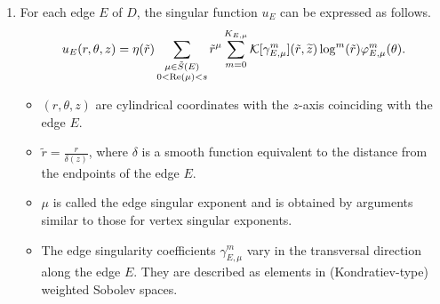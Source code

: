 ﻿\documentclass[11pt,reqno,oneside]{amsart}
\theoremstyle{definition}
\theoremstyle{remark}
\newcommand{\C}{\mathbb{C}}
\renewcommand{\S}{\mathbb{S}}
\renewcommand{\Re}{{\rm Re}}
\renewcommand{\d}{\delta}
\newcommand{\g}{\gamma}
\newcommand{\vf}{\varphi}
\newcommand{\lm}{\lambda}
\renewcommand{\t}{\theta}
\newcommand{\p}{\partial}
\renewcommand{\O}{\Omega}
\newcommand{\ds}{\displaystyle}
\begin{document}
\begin{enumerate}
\begin{itemize}
            \item The $\log$ terms appear only when $\lm$ is an integer. We will later impose a generic condition that $K_{{\bf v},\lm}=0$ for the singular exponents $\lm$ under consideration.
            \item The singularity coefficients $\g_{{\bf v},\lm}^m\in\C$ depend continuously on the input data and the geometry of the polyhedron $D$. In fact, the coefficients $\g_{{\bf v},\lm}^m$ can be expressed as duality pairings between the input data and associated singular functions of the adjoint problem. Such formulas can be found, for example, in \cite{Nicaise1990}. Moreover, the following estimate holds \cite{Nicaise1994i,Nicaise1994ii},
            \begin{align*}
                |\g_{{\bf v},\lm}^m|\leq C \|f\|_{H^{1/2}(\p\O)}\lesssim 1.
            \end{align*}
            \item The singular functions $\Phi_{{\bf v},\lm}^m \in H^1(\S^2)$ are harmonic in each subdomain of $\S^2$ and satisfy the same transmission conditions across interfaces. We discuss in more detail below the characterization of the singular exponents $\lm$ and the associated functions $\Phi_{{\bf v},\lm}^m$.
        \end{itemize}
        \item For each edge $E$ of $D$, the singular function $u_E$ can be expressed as follows.
        \begin{align*}
            u_E(r,\t,z)=\eta(\tilde{r})\sum_{\begin{subarray}{c}
            \mu\in \tilde{S}(E)\\ 0<\Re(\mu)<s
        \end{subarray}}\tilde{r}^\mu\sum_{m=0}^{K_{E,\mu}}\mathcal{K}[\g_{E,\mu}^m](\tilde{r},\widetilde{z}) \log^m(\tilde{r}) \vf_{E,\mu}^m(\t).
        \end{align*}
        \begin{itemize}
            \item $(r,\t,z)$ are cylindrical coordinates with the $z$-axis coinciding with the edge $E$.
            \item $\ds \tilde{r}=\frac{r}{\d(z)}$, where $\d$ is a smooth function equivalent to the distance from the endpoints of the edge $E$.
            \item $\mu$ is called the edge singular exponent and is obtained by arguments similar to those for vertex singular exponents.
            \item The edge singularity coefficients $\g_{E,\mu}^m$ vary in the transversal direction along the edge $E$. They are described as elements in (Kondratiev-type) weighted Sobolev spaces.

\end{itemize}
\end{enumerate}
\end{document}
